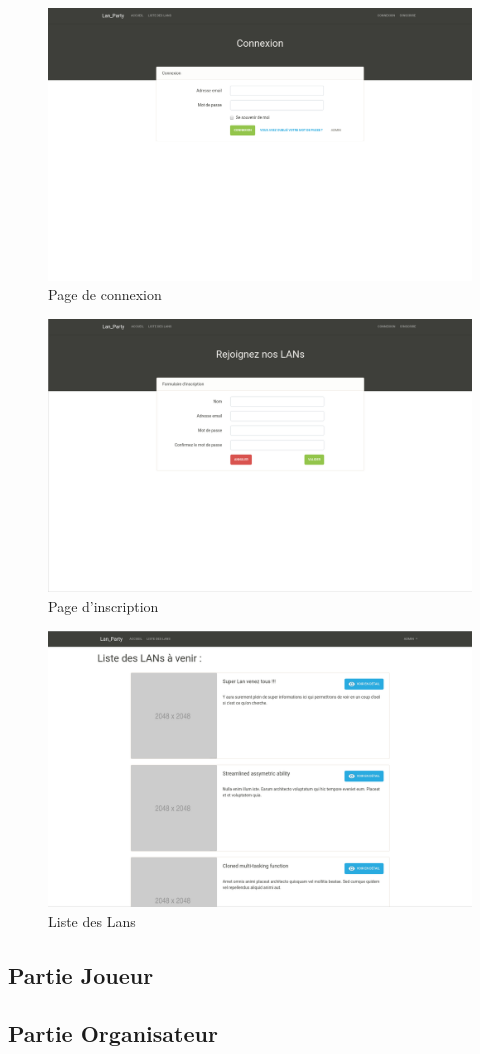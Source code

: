 \documentclass[12pt]{article}
\begin{document}
\begin{figure}[H]
\centering
\includegraphics[scale=0.20]{images/connexion.jpg}
\caption{Page de connexion}
\label{}
\end{figure}

\begin{figure}[H]
\centering
\includegraphics[scale=0.20]{images/inscription.png}
\caption{Page d'inscription}
\label{}
\end{figure}

\begin{figure}[H]
\centering
\includegraphics[scale=0.20]{images/liste.png}
\caption{Liste des Lans}
\label{}
\end{figure}

\subsection{Partie Joueur}

\subsection{Partie Organisateur}
\end{document}
